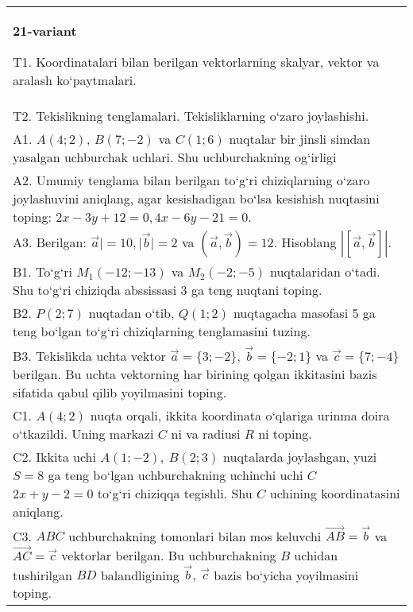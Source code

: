 \documentclass{article}
\begin{document}
\begin{tabular}{m{17cm}}
\textbf{21-variant}
\newline

T1. 
Koordinatalari bilan berilgan vektorlarning skalyar, vektor va aralash ko‘paytmalari. \\
T2. 
Tekislikning tenglamalari. Tekisliklarning o‘zaro joylashishi.
 \\
A1. 
$A (4;2) $, $B (7;-2) $ va $C (1;6) $ nuqtalar bir jinsli
simdan yasalgan uchburchak uchlari. Shu uchburchakning og‘irligi
 \\
A2. 
Umumiy tenglama bilan berilgan to‘g‘ri chiziqlarning
o‘zaro joylashuvini aniqlang, agar kesishadigan bo‘lsa kesishish nuqtasini
toping: $2x-3y+12=0, 4x-6y-21=0$.
 \\
A3. 
Berilgan: $\overrightarrow{a}| = 10,|\overrightarrow{b}| = 2$ va
$\left(\overrightarrow{a},\overrightarrow{b} \right) = 12$. Hisoblang
$\left| \left\lbrack \overrightarrow{a},\overrightarrow{b} \right\rbrack \right|$.
 \\
B1. 
To‘g‘ri \(M_{1} (-12;-13) \) va \(M_{2} (-2;-5) \)
nuqtalaridan o‘tadi. Shu to‘g‘ri chiziqda abssissasi 3 ga teng nuqtani toping.
 \\
B2. 
\(P (2;7) \) nuqtadan o‘tib, \(Q (1;2) \) nuqtagacha
masofasi 5 ga teng bo‘lgan to‘g‘ri chiziqlarning tenglamasini tuzing.
 \\
B3. Tekislikda uchta vektor $\vec{a} = \{ 3; - 2\}$, $\vec{b} = \{ - 2;1\}$ va $\vec{c} = \{ 7; - 4\}$ berilgan. Bu uchta vektorning har birining qolgan ikkitasini bazis sifatida qabul qilib yoyilmasini toping.
 \\
C1. \(A (4;2) \) nuqta orqali, ikkita koordinata o‘qlariga
urinma doira o‘tkazildi. Uning markazi $C$ ni va radiusi
$R$ ni toping.
 \\
C2. Ikkita uchi \(A (1; - 2),\ B (2;3) \) nuqtalarda joylashgan,
yuzi \(S = 8\) ga teng bo‘lgan uchburchakning uchinchi uchi
$C$ \(2x + y - 2 = 0\) to‘g‘ri chiziqqa tegishli. Shu $C$ uchining
koordinatasini aniqlang.
 \\
C3. 
\(ABC\) uchburchakning tomonlari bilan mos keluvchi \(\vec{AB} = \vec{b}\) va \(\vec{AC} = \vec{c}\) vektorlar berilgan. Bu uchburchakning \(B\) uchidan tushirilgan \(BD\) balandligining \(\vec{b},\ \vec{c}\) bazis bo‘yicha yoyilmasini toping.
 \\

\end{tabular}
\vspace{1cm}
\end{document}
